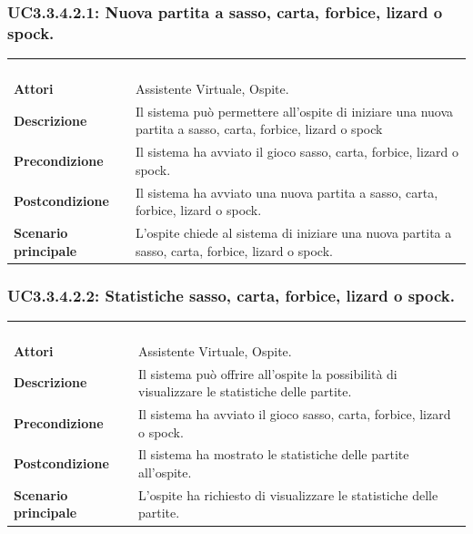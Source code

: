 \subsubsection{UC3.3.4.2.1: Nuova partita a sasso, carta, forbice, lizard o spock.}
\label{UC3.3.4.2.1}
\begin{longtable}{l|p{10cm}}
	\rowcolor[gray]{0.8} \multicolumn{2}{c}{} \\
	\rowcolor[gray]{0.8} \multicolumn{2}{c}{\textbf{UC3.3.4.2.1 - Nuova partita a sasso, carta, forbice, lizard o spock.}} \\
	\rowcolor[gray]{0.8} \multicolumn{2}{c}{} \\
	\hline
	&\\
	\textbf{Attori} & Assistente Virtuale, Ospite.\\[7pt]
	\textbf{Descrizione} & Il sistema può permettere all'ospite di iniziare una nuova partita a sasso, carta, forbice, lizard o spock\\[7pt]
	\textbf{Precondizione} & Il sistema ha avviato il gioco sasso, carta, forbice, lizard o spock.\\[7pt]
	\textbf{Postcondizione} & Il sistema ha avviato una nuova partita a sasso, carta, forbice, lizard o spock.\\[7pt]
	\textbf{Scenario principale} &L'ospite chiede al sistema di iniziare una nuova partita a sasso, carta, forbice, lizard o spock.\\[7pt]\hline
\end{longtable}

\subsubsection{UC3.3.4.2.2: Statistiche sasso, carta, forbice, lizard o spock.}
\label{UC3.3.4.2.2}
\begin{longtable}{l|p{10cm}}
	\rowcolor[gray]{0.8} \multicolumn{2}{c}{} \\
	\rowcolor[gray]{0.8} \multicolumn{2}{c}{\textbf{UC3.3.4.2.2 - Statistiche sasso, carta, forbice, lizard o spock.}} \\
	\rowcolor[gray]{0.8} \multicolumn{2}{c}{} \\
	\hline
	&\\
	\textbf{Attori} & Assistente Virtuale, Ospite.\\[7pt]
	\textbf{Descrizione} & Il sistema può offrire all'ospite la possibilità di visualizzare le statistiche delle partite.\\[7pt]
	\textbf{Precondizione} & Il sistema ha avviato il gioco sasso, carta, forbice, lizard o spock.\\[7pt]
	\textbf{Postcondizione} & Il sistema ha mostrato le statistiche delle partite all'ospite.\\[7pt]
	\textbf{Scenario principale} &L'ospite ha richiesto di visualizzare le statistiche delle partite.\\[7pt]\hline
\end{longtable}

